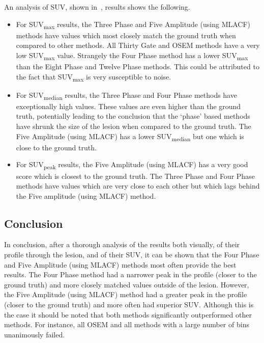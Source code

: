             An analysis of \gls{SUV}, shown in~, results shows the following.

            \begin{itemize}
                \item For \gls{SUV}\textsubscript{max} results, the Three Phase and Five Amplitude (using \gls{MLACF}) methods have values which most closely match the ground truth when compared to other methods. All Thirty Gate and \gls{OSEM} methods have a very low \gls{SUV}\textsubscript{max} value. Strangely the Four Phase method has a lower \gls{SUV}\textsubscript{max} than the Eight Phase and Twelve Phase methods. This could be attributed to the fact that \gls{SUV}\textsubscript{max} is very susceptible to noise.

                \item For \gls{SUV}\textsubscript{median} results, the Three Phase and Four Phase methods have exceptionally high values. These values are even higher than the ground truth, potentially leading to the conclusion that the `phase' based methods have shrunk the size of the lesion when compared to the ground truth. The Five Amplitude (using \gls{MLACF}) has a lower \gls{SUV}\textsubscript{median} but one which is close to the ground truth.

                \item For \gls{SUV}\textsubscript{peak} results, the Five Amplitude (using \gls{MLACF}) has a very good score which is closest to the ground truth. The Three Phase and Four Phase methods have values which are very close to each other but which lags behind the Five amplitude (using \gls{MLACF}) method.
            \end{itemize}

        \subsection{Conclusion} \label{sec:evaluation_of_pet_ct_motion_correction_incorporating_motion_models_using_mlacf_and_complex_gating_schemes_conclusion}
            In conclusion, after a thorough analysis of the results both visually, of their profile through the lesion, and of their \gls{SUV}, it can be shown that the Four Phase and Five Amplitude (using \gls{MLACF}) methods most often provide the best results. The Four Phase method had a narrower peak in the profile (closer to the ground truth) and more closely matched values outside of the lesion. However, the Five Amplitude (using \gls{MLACF}) method had a greater peak in the profile (closer to the ground truth) and more often had superior \gls{SUV}. Although this is the case it should be noted that both methods significantly outperformed other methods. For instance, all \gls{OSEM} and all methods with a large number of bins unanimously failed.
            

